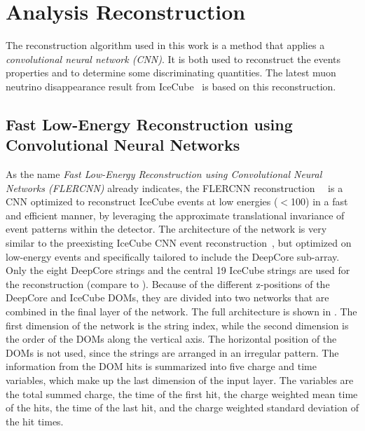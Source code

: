 \section{Analysis Reconstruction} 

The reconstruction algorithm used in this work is a method that applies a \textit{convolutional neural network (CNN)}. It is both used to reconstruct the events properties and to determine some discriminating quantities. The latest muon neutrino disappearance result from IceCube~ is based on this reconstruction.


\subsection{Fast Low-Energy Reconstruction using Convolutional Neural Networks} 

As the name \textit{Fast Low-Energy Reconstruction using Convolutional Neural Networks (FLERCNN)} already indicates, the FLERCNN reconstruction~~\cite{flercnn} is a CNN optimized to reconstruct IceCube events at low energies ($<$\SI{100}{\gev}) in a fast and efficient manner, by leveraging the approximate translational invariance of event patterns within the detector. The architecture of the network is very similar to the preexisting IceCube CNN event reconstruction~, but optimized on low-energy events and specifically tailored to include the DeepCore sub-array. Only the eight DeepCore strings and the central 19 IceCube strings are used for the reconstruction (compare to ). Because of the different z-positions of the DeepCore and IceCube DOMs, they are divided into two networks that are combined in the final layer of the network. The full architecture is shown in . The first dimension of the network is the string index, while the second dimension is the order of the DOMs along the vertical axis. The horizontal position of the DOMs is not used, since the strings are arranged in an irregular pattern. The information from the DOM hits is summarized into five charge and time variables, which make up the last dimension of the input layer. The variables are the total summed charge, the time of the first hit, the charge weighted mean time of the hits, the time of the last hit, and the charge weighted standard deviation of the hit times.

